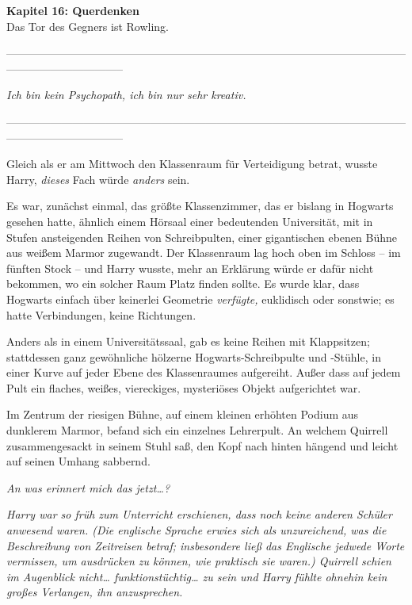 

\hypertarget{querdenken}{%

\textbf{Kapitel 16: Querdenken}\\

Das Tor des Gegners ist Rowling.

--------------------------------------------------------------------------------------------------------------------------------------------

\emph{Ich bin kein Psychopath, ich bin nur sehr kreativ.}

--------------------------------------------------------------------------------------------------------------------------------------------

Gleich als er am Mittwoch den Klassenraum für Verteidigung betrat, wusste Harry, \emph{dieses} Fach würde \emph{anders} sein.

Es war, zunächst einmal, das größte Klassenzimmer, das er bislang in Hogwarts gesehen hatte, ähnlich einem Hörsaal einer bedeutenden Universität, mit in Stufen ansteigenden Reihen von Schreibpulten, einer gigantischen ebenen Bühne aus weißem Marmor zugewandt. Der Klassenraum lag hoch oben im Schloss -- im fünften Stock -- und Harry wusste, mehr an Erklärung würde er dafür nicht bekommen, wo ein solcher Raum Platz finden sollte. Es wurde klar, dass Hogwarts einfach über keinerlei Geometrie \emph{verfügte,} euklidisch oder sonstwie; es hatte Verbindungen, keine Richtungen.

Anders als in einem Universitätssaal, gab es keine Reihen mit Klappsitzen; stattdessen ganz gewöhnliche hölzerne Hogwarts-Schreibpulte und -Stühle, in einer Kurve auf jeder Ebene des Klassenraumes aufgereiht. Außer dass auf jedem Pult ein flaches, weißes, viereckiges, mysteriöses Objekt aufgerichtet war.

Im Zentrum der riesigen Bühne, auf einem kleinen erhöhten Podium aus dunklerem Marmor, befand sich ein einzelnes Lehrerpult. An welchem Quirrell zusammengesackt in seinem Stuhl saß, den Kopf nach hinten hängend und leicht auf seinen Umhang sabbernd.

\emph{An was erinnert mich das jetzt…?}

\emph{Harry war so früh zum Unterricht erschienen, dass noch keine anderen Schüler anwesend waren. (Die englische Sprache erwies sich als unzureichend, was die Beschreibung von Zeitreisen betraf; insbesondere ließ das Englische jedwede Worte vermissen, um ausdrücken zu können, wie praktisch sie waren.) Quirrell schien im Augenblick nicht… funktionstüchtig… zu sein und Harry fühlte ohnehin kein großes Verlangen, ihn anzusprechen.}

}
